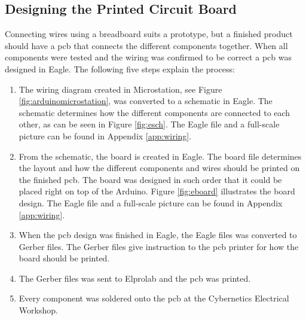 \subsection{Designing the Printed Circuit Board}
Connecting wires using a breadboard suits a prototype, but a finished product should have a \acrshort{pcb} that connects the different components together. When all components were tested and the wiring was confirmed to be correct a \acrshort{pcb} was designed in Eagle. The following five steps explain the process:
\begin{enumerate}[1.]
\item The wiring diagram created in Microstation, see Figure \ref{fig:arduinomicrostation}, was converted to a schematic in Eagle. The schematic determines how the different components are connected to each other, as can be seen in Figure \ref{fig:esch}. The Eagle file and a full-scale picture can be found in Appendix \ref{app:wiring}.
\item From the schematic, the board is created in Eagle. The board file determines the layout and how the different components and wires should be printed on the finished \acrshort{pcb}. The board was designed in such order that it could be placed right on top of the Arduino. Figure \ref{fig:eboard} illustrates the board design. The Eagle file and a full-scale picture can be found in Appendix \ref{app:wiring}.
\item When the \acrshort{pcb} design was finished in Eagle, the Eagle files was converted to Gerber files. The Gerber files give instruction to the \acrshort{pcb} printer for how the board should be printed.
\item The Gerber files was sent to Elprolab and the \acrshort{pcb} was printed.
\item Every component was soldered onto the \acrshort{pcb} at the Cybernetics Electrical Workshop.
\end{enumerate}